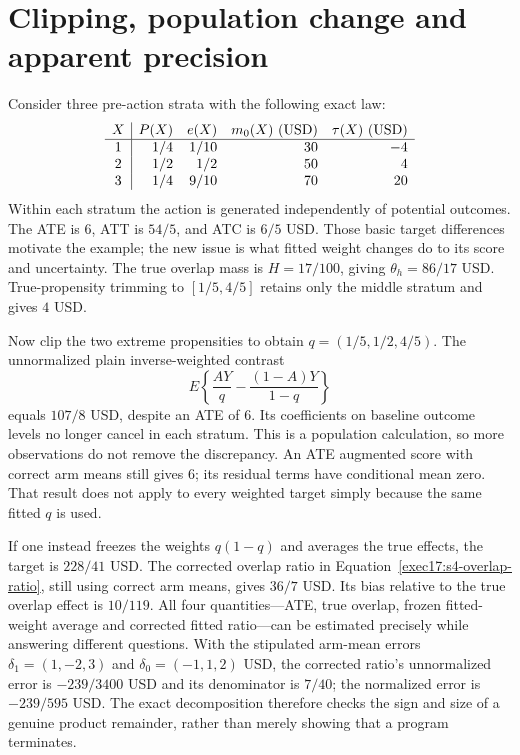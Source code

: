 \section{Clipping, population change and apparent precision}
\label{exec17:s4-clipping}

Consider three pre-action strata with the following exact law:
\[
\begin{array}{c|rrrr}
 X& P(X)&e(X)&m_0(X)\ ({\rm USD})&\tau(X)\ ({\rm USD})\\ \hline
 1&1/4&1/10&30&-4\\
 2&1/2&1/2&50&4\\
 3&1/4&9/10&70&20
\end{array}
\]
Within each stratum the action is generated independently of potential
outcomes. The ATE is $6$, ATT is $54/5$, and ATC is $6/5$ USD. Those basic
target differences motivate the example; the new issue is what fitted
weight changes do to its score and uncertainty. The true overlap mass is
$H=17/100$, giving $\theta_h=86/17$ USD. True-propensity trimming to
$[1/5,4/5]$ retains only the middle stratum and gives $4$ USD.
\citep{exec17_s4_math}

Now clip the two extreme propensities to obtain
$q=(1/5,1/2,4/5)$. The unnormalized plain inverse-weighted contrast
\[
 E\left\{\frac{AY}{q}-\frac{(1-A)Y}{1-q}\right\}
\]
equals $107/8$ USD, despite an ATE of $6$. Its coefficients on baseline
outcome levels no longer cancel in each stratum. This is a population
calculation, so more observations do not remove the discrepancy. An ATE
augmented score with correct arm means still gives $6$; its residual terms
have conditional mean zero. That result does not apply to every weighted
target simply because the same fitted $q$ is used.

If one instead freezes the weights $q(1-q)$ and averages the true effects,
the target is $228/41$ USD. The corrected overlap ratio in
Equation~\eqref{exec17:s4-overlap-ratio}, still using correct arm means,
gives $36/7$ USD. Its bias relative to the true overlap effect is $10/119$.
All four quantities---ATE, true overlap, frozen fitted-weight average and
corrected fitted ratio---can be estimated precisely while answering different
questions. With the stipulated arm-mean errors
$\delta_1=(1,-2,3)$ and $\delta_0=(-1,1,2)$ USD, the corrected ratio's
unnormalized error is $-239/3400$ USD and its denominator is $7/40$;
the normalized error is $-239/595$ USD. The exact decomposition therefore
checks the sign and size of a genuine product remainder, rather than merely
showing that a program terminates.\citep{exec17_s4_math}

